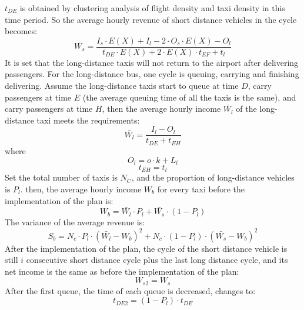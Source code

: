 $t_{DE}$ is obtained by clustering analysis of flight density and taxi density in this time period. So the average hourly revenue of short distance vehicles in the cycle becomes:
\begin{equation}
	\bar{W_{s}} = \frac{I_{s}\cdot E(X)+I_{l}-2\cdot O_{s}\cdot E(X)-O_{l}}{t_{DE} \cdot E(X)+2 \cdot E(X)\cdot t_{EF}+t_{l}}
\label{W_s_bar}
\end{equation}
It is set that the long-distance taxis will not return to the airport after delivering passengers. For the long-distance bus, one cycle is queuing, carrying and finishing delivering. Assume the long-distance taxis start to queue at time $D$, carry passengers at time $E$ (the average queuing time of all the taxis is the same), and carry passengers at time $H$, then the average hourly income $\bar{W_{l}}$ of the long-distance taxi meets the requirements:
\begin{equation}
	\bar{W_{l}} = \frac{I_{l}-O_{l}}{t_{DE} +t_{EH}}
\label{W_l_bar}
\end{equation}
where
\begin{equation}
	O_{l} = o \cdot k + L_{l}
\label{O_l}
\end{equation}
\begin{equation}
	t_{EH} = t_{l}
\label{t_EH}
\end{equation}
Set the total number of taxis is $N_{C}$, and the proportion of long-distance vehicles is $P_{l}$. then, the average hourly income $W_{b}$ for every taxi  before the implementation of the plan is:
\begin{equation}
	W_{b} = \bar{W_{l}}\cdot P_{l} + \bar{W_{s}} \cdot (1 - P_{l})
\label{W_b}
\end{equation}
The variance of the average revenue is:
\begin{equation}
	S_{b} = N_{c}\cdot P_{l}\cdot (\bar{W_{l}} - W_{b})^{2} + N_{c}\cdot(1- P_{l}) \cdot (\bar{W_{s}} - W_{b})^{2}
\label{S_b}
\end{equation}
After the implementation of the plan, the cycle of the short distance vehicle is still $i$ consecutive short distance cycle plus the last long distance cycle, and its net income is the same as before the implementation of the plan:
\begin{equation}
	W_{s2} = W_{s}
\label{W_s2}
\end{equation}
After the first queue, the time of each queue is decreased, changes to:
\begin{equation}
	t_{DE2} = (1-P_{l})\cdot t_{DE}
\label{t_DE2}
\end{equation}
